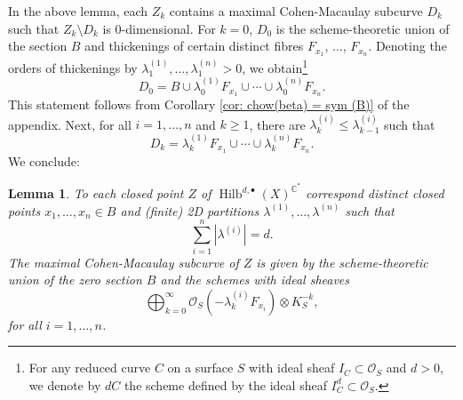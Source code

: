 \documentclass{amsart}
\newtheorem{proposition}[theorem]{Proposition}
\newtheorem{lemma}[theorem]{Lemma}
\theoremstyle{definition}
\newcommand{\CC} {\mathbb{C}}          %
\renewcommand{\O}{\mathcal{O}}
\newcommand{\Hilb}{\operatorname{Hilb}}
\begin{document}
In the above lemma, each $Z_k$ contains a maximal Cohen-Macaulay subcurve $D_k$ such that $Z_k \setminus D_k$ is 0-dimensional. For $k=0$, $D_0$ is the scheme-theoretic union of the section $B$ and thickenings of certain distinct fibres $F_{x_1}$, $\ldots$, $F_{x_n}$. Denoting the orders of thickenings by $\lambda_{1}^{(1)}, \ldots, \lambda_{1}^{(n)} > 0$, we obtain\footnote{For any reduced curve $C$ on a surface $S$ with ideal sheaf $I_C \subset \O_S$ and $d>0$, we denote by $d C$ the scheme defined by the ideal sheaf $I_{C}^{d} \subset \O_S$.}
$$
D_0 = B \cup \lambda_{0}^{(1)} F_{x_1} \cup \cdots \cup \lambda_{0}^{(n)} F_{x_n}.
$$
This statement follows from Corollary \ref{cor: chow(beta) = sym (B)} of the appendix. Next, for all $i = 1, \ldots, n$ and $k \geq 1$, there are $\lambda_{k}^{(i)} \leq \lambda_{k-1}^{(i)}$ such that
$$
D_k = \lambda_{k}^{(1)} F_{x_1} \cup \cdots \cup \lambda_{k}^{(n)} F_{x_n}.
$$
We conclude:
\begin{lemma}
To each closed point $Z$ of $\Hilb^{d,\bullet}(X)^{\CC^*}$ correspond distinct closed points $x_1, \ldots, x_n \in B$ and (finite) 2D partitions $\lambda^{(1)}, \ldots, \lambda^{(n)}$ such that
$$
\sum_{i=1}^{n} |\lambda^{(i)}| = d.
$$
The maximal Cohen-Macaulay subcurve of $Z$ is given by the scheme-theoretic union of the zero section $B$ and the schemes with ideal sheaves
\begin{equation} \label{CMcurve}
\bigoplus_{k=0}^{\infty} \O_{S}(-\lambda_{k}^{(i)} F_{x_i}) \otimes K_{S}^{-k},
\end{equation}
for all $i = 1, \ldots, n$.
\end{lemma}
\end{document}
